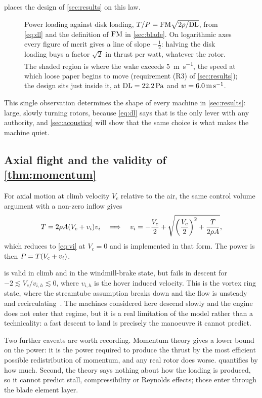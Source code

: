  places the design of \cref{sec:results} on this law.

\begin{figure}[tbp]
\centering

\caption{Power loading against disk loading, $T/P = \mathrm{FM}\sqrt{2\rho/\mathrm{DL}}$,
from \cref{eq:dl} and the definition of $\mathrm{FM}$ in \cref{sec:blade}. On
logarithmic axes every figure of merit gives a line of slope $-\tfrac12$:
halving the disk loading buys a factor $\sqrt2$ in thrust per watt, whatever
the rotor. The shaded region is where the wake exceeds
\SI{5}{\metre\per\second}, the speed at which loose paper begins to move
(requirement (R3) of \cref{sec:results}); the design sits just inside it, at
$\mathrm{DL} = \SI{22.2}{\pascal}$ and $w = \SI{6.0}{\metre\per\second}$.}
\label{fig:powerloading}
\end{figure}

This single observation determines the shape of every machine in
\cref{sec:results}: large, slowly turning rotors, because
\cref{eq:dl} says that is the only lever with any authority, and
\cref{sec:acoustics} will show that the same choice is what makes the machine
quiet.

\subsection{Axial flight and the validity of \texorpdfstring{\cref{thm:momentum}}{Theorem 3.2}}

For axial motion at climb velocity $V_c$ relative to the air, the same control
volume argument with a non-zero inflow gives
\begin{equation}
  T = 2\rho A (V_c + v_i)v_i
  \quad\Longrightarrow\quad
  v_i = -\frac{V_c}{2} + \sqrt{\left(\frac{V_c}{2}\right)^2
          + \frac{T}{2\rho A}} ,
  \label{eq:axial}
\end{equation}
which reduces to \cref{eq:vi} at $V_c=0$ and is implemented in that form. The
power is then $P = T(V_c + v_i)$.

 is valid in climb and in the windmill-brake state, but fails in
descent for $-2 \lesssim V_c/v_{i,h} \lesssim 0$, where $v_{i,h}$ is the hover
induced velocity. This is the vortex ring state, where
the streamtube assumption breaks down and the flow is unsteady and
recirculating~\cite[\S2.13]{leishman2006}. The machines considered here descend
slowly and the engine does not enter that regime, but it is a real limitation
of the model rather than a technicality: a fast descent to land is precisely
the manoeuvre it cannot predict.

Two further caveats are worth recording. Momentum theory gives a lower bound on
the power: it is the power required to produce the thrust by the most efficient
possible redistribution of momentum, and any real rotor does worse.
 quantifies by how much. Second, the theory says nothing about
how the loading is produced, so it cannot predict stall, compressibility or
Reynolds effects; those enter through the blade element layer.
